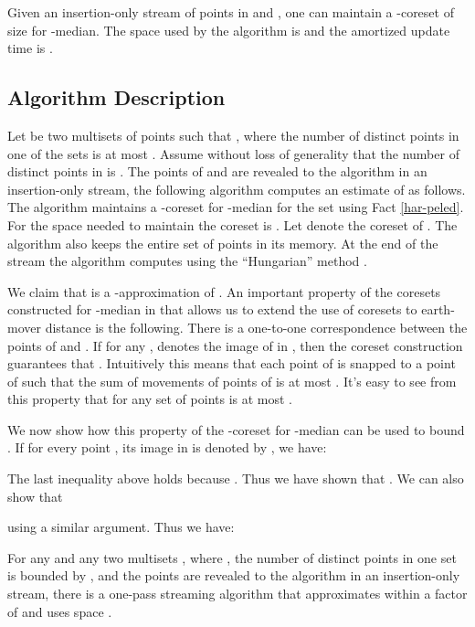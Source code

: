 \documentclass[oribibl]{llncs}
\begin{document}
\begin{fact}\label{har-peled}
 Given an insertion-only stream  of  points in  and
, one can maintain a
-coreset of size  for -median.
The space used by the algorithm is  and the
amortized update time is .
\end{fact}

\subsection{Algorithm Description}
Let  be two multisets of points such that ,
where the number of distinct points in one of the sets is at most
. Assume without loss of generality that the
number of distinct points in  is .
The points of  and  are revealed to the algorithm in an insertion-only
stream, the following algorithm computes an estimate of  as follows.
The algorithm maintains a -coreset for -median
for the set  using Fact \ref{har-peled}. For  the space needed to
maintain the coreset is . Let  denote
the coreset of . The algorithm also
keeps the entire set  of points in its memory. At the end of
the stream the algorithm computes  using the
``Hungarian'' method \cite{lawler}.

We claim that  is a -approximation
of . An important property of the coresets constructed for 
-median in \cite{kcoreset} that allows us to extend the use of
coresets to earth-mover distance is the following. There is a
one-to-one correspondence between the points of  and .
If for any ,  denotes the image of  in ,
then the coreset construction guarantees that
.
Intuitively this means that each point of  is snapped to
a point of  such that the sum of movements of points
of  is at most . It's easy to
see from this property that for any set  of points
 is at most
.

We now show how this property of the -coreset
for -median can be used to bound .
If for every point
, its image in  is denoted by , we have: 



The last inequality above holds because
.
Thus we have shown that .
We can also show that 

using a similar argument. Thus we have:

\begin{theorem}
For any  and any two multisets , where
, the number of distinct points in one set is bounded by ,
and the points are revealed to the algorithm in an insertion-only stream,
there is a one-pass streaming algorithm that approximates
 within a factor of  and uses space
.
\end{theorem}
\end{document}

